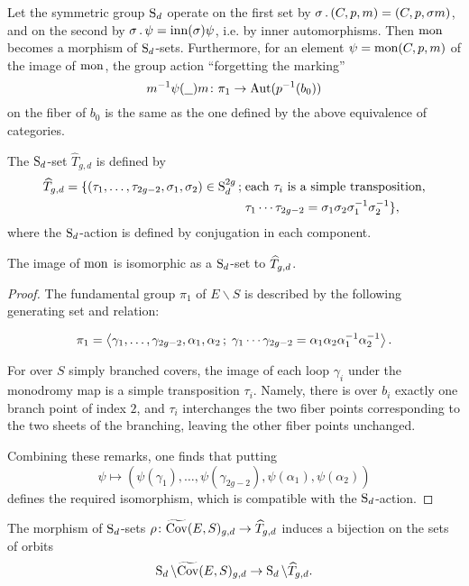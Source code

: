 Let the symmetric group $\operatorname{S}_d$ operate on the first set by $\sigma \,.\, (C,p,m)=(C,p,\sigma m)$, and on the second by $\sigma \,.\, \psi = \operatorname{inn}(\sigma) \psi$, i.e. by inner automorphisms. Then $\operatorname{mon}$ becomes a morphism of $\operatorname{S}_d$-sets.
Furthermore, for an element $\psi=\operatorname{mon}(C,p,m)$ of the image of $\operatorname{mon}$, the group action ``forgetting the marking'' \[m^{-1}\psi(\underline{\ \ })m\cl\pi_1\to \Aut(p^{-1}(b_0))\] on the fiber of $b_0$ is the same as the one defined by the above equivalence of categories.

\begin{defi}
 The $\operatorname{S}_d$-set $\widehat{T}_{g,d}$ is defined by
 \begin{align*}
 \widehat{T}_{g,d} = \{(\tau_1,\dotsc,\tau_{2g-2},\sigma_1,\sigma_2)\in \operatorname{S}_d^{2g} \,;\; &\text{each }\tau_i\text{ is a simple transposition,}\\ &\tau_1\dotsm\tau_{2g-2}=\sigma_1\sigma_2\sigma_1^{-1}\sigma_2^{-1}\},
 \end{align*}
  where the $\operatorname{S}_d$-action is defined by conjugation in each component.
\end{defi}

\begin{prop} \label{prop:classifying-set}
 The image of $\operatorname{mon}$ is isomorphic as a $\operatorname{S}_d$-set to $\widehat{T}_{g,d}$.
\end{prop}

\begin{proof}
 The fundamental group $\pi_1$ of $E\smallsetminus S$ is described by the following generating set and relation:

 \[\pi_1=\left\langle \gamma_1,\dotsc,\gamma_{2g-2},\alpha_1,\alpha_2\,;\; \gamma_1\dotsm\gamma_{2g-2}=\alpha_1\alpha_2\alpha_1^{-1}\alpha_2^{-1} \right\rangle.\]

 For over $S$ simply branched covers, the image of each loop $\gamma_i$ under the monodromy map is a simple transposition $\tau_i$. Namely, there is over $b_i$ exactly one branch point of index $2$, and $\tau_i$ interchanges the two fiber points corresponding to the two sheets of the branching, leaving the other fiber points unchanged.
 
 Combining these remarks, one finds that putting
 \[\psi \mapsto (\psi(\gamma_1),\dotsc,\psi(\gamma_{2g-2}),\psi({\alpha_1}),\psi({\alpha_2}))\]
 defines the required isomorphism, which is compatible with the $\operatorname{S}_d$-action.
\end{proof}

\begin{prop} \label{prop:classification-of-covers}
 The morphism of $\operatorname{S}_d$-sets $\rho\colon \widetilde{\operatorname{Cov}}(E,S)_{g,d} \to \widehat{T}_{g,d}$ induces a bijection on the sets of orbits
 \[\operatorname{S}_d\backslash\widetilde{\operatorname{Cov}}(E,S)_{g,d}\to \operatorname{S}_d\backslash\widehat{T}_{g,d}.\] 
 
\end{prop}

